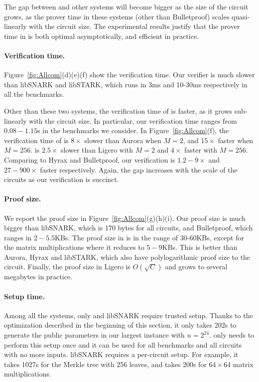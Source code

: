 The gap between \name and other systems will become bigger as the size of the circuit grows, as the prover time in these systems (other than Bulletproof) scales quasi-linearly with the circuit size. The experimental results justify that the prover time in \name is both optimal asymptotically, and efficient in practice.

\paragraph{Verification time.} Figure~\ref{fig:Allcom}(d)(e)(f) show the verification time. Our verifier is much slower than libSNARK and libSTARK, which runs in 3ms and 10-30ms respectively in all the benchmarks. 

Other than these two systems, the verification time of \name is faster, as it grows sub-linearly with the circuit size. In particular, our verification time ranges from $0.08-1.15$s in the benchmarks we consider. In Figure~\ref{fig:Allcom}(f), the verification time of \name is $8\times$ slower than Aurora when $M=2$, and $15\times$ faster when $M=256$. \name is $2.5\times$ slower than Ligero with $M=2$ and $4\times$ faster with $M=256$. Comparing to Hyrax and Bulletproof, our verification is $1.2-9\times$ and $27-900\times$ faster respectively. Again, the gap increases with the scale of the circuits as our verification is succinct.

\paragraph{Proof size.} We report the proof size in Figure~\ref{fig:Allcom}(g)(h)(i). Our proof size is much bigger than libSNARK, which is 170 bytes for all circuits, and Bulletproof, which ranges in $2-5.5$KBs. The proof size in \name is in the range of 30-60KBs, except for the matrix multiplications where it reduces to $5-9$KBs. This is better than Aurora, Hyrax and libSTARK, which also have polylogarithmic proof size to the circuit. Finally, the proof size in Ligero is $O(\sqrt{C})$ and grows to several megabytes in practice.

\paragraph{Setup time.} Among all the systems, only \name and libSNARK require trusted setup. Thanks to the optimization described in the beginning of this section, it only takes 202s to generate the public parameters in our largest instance with $n = 2^24$. \name only needs to perform this setup once and it can be used for all benchmarks and all circuits with no more inputs. libSNARK requires a per-circuit setup. For example, it takes 1027s for the Merkle tree with 256 leaves, and takes 200s for $64\times 64$ matrix multiplications. 


